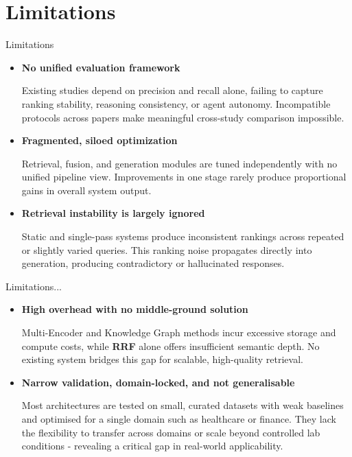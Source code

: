 \section{Limitations}
\begin{frame}{Limitations}
    \begin{itemize}
        \item \textbf{No unified evaluation framework}

        
        Existing studies depend on precision and recall alone, failing to capture ranking stability, reasoning consistency, or agent autonomy. Incompatible protocols across papers make meaningful cross-study comparison impossible.

        \item \textbf{Fragmented, siloed optimization}


        Retrieval, fusion, and generation modules are tuned independently with no unified pipeline view. Improvements in one stage rarely produce proportional gains in overall system output.

        \item \textbf{Retrieval instability is largely ignored}


        Static and single-pass systems produce inconsistent rankings across repeated or slightly varied queries. This ranking noise propagates directly into generation, producing contradictory or hallucinated responses.


        \end{itemize}
\end{frame}

\begin{frame}{Limitations...}
    \begin{itemize}
        \item \textbf{High overhead with no middle-ground solution}


        Multi-Encoder and Knowledge Graph methods incur excessive storage and compute costs, while \textbf{RRF} alone offers insufficient semantic depth. No existing system bridges this gap for scalable, high-quality retrieval.

        \item \textbf{Narrow validation, domain-locked, and not generalisable}


        Most architectures are tested on small, curated datasets with weak baselines and optimised for a single domain such as healthcare or finance. They lack the flexibility to transfer across domains or scale beyond controlled lab conditions - revealing a critical gap in real-world applicability.
    \end{itemize}
\end{frame}
        

        
    